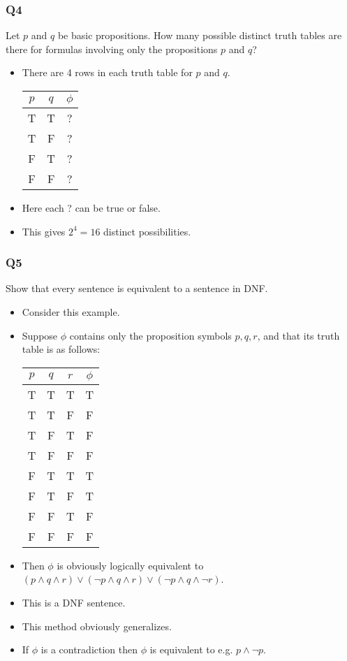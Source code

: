 \documentclass[handout]{beamer}
\begin{document}
\begin{frame}
\frametitle{Q4}
Let $p$ and $q$ be basic propositions. How many possible distinct truth tables are there for formulas involving only the propositions $p$ and $q$?
\vspace{0.5cm}
\begin{itemize}
\item There are 4 rows in each truth table for $p$ and $q$.

{\centering
\begin{tabular}{ c c c }
 $p$ & $q$ & $\phi$ \\ \hline 
 T & T & ?  \\  
 T & F & ?  \\
 F & T & ?  \\
 F & F & ?  
\end{tabular}\par}

\item Here each ? can be true or false. 
\item This gives $2^4 = 16$ distinct possibilities.
\end{itemize}
\end{frame}

\begin{frame}
\frametitle{Q5}
Show that every sentence is equivalent to a sentence in DNF.
\begin{itemize}
\item Consider this example. 
\item Suppose $\phi$ contains only the proposition symbols $p,q,r$, and that its truth table is as follows:

{\centering
\begin{tabular}{ c c c c }
 $p$ & $q$ & $r$ & $\phi$ \\ \hline 
 T & T & T & T  \\  
 T & T & F & F  \\
 T & F & T & F  \\
 T & F & F & F  \\
 F & T & T & T  \\  
 F & T & F & T  \\
 F & F & T & F  \\
 F & F & F & F  \\
\end{tabular}\par}
\item Then $\phi$ is obviously logically equivalent to $(p\wedge q \wedge r) \vee (\neg p\wedge q \wedge r) \vee (\neg p \wedge q \wedge \neg r)$. 
\item This is a DNF sentence. 
\item This method obviously generalizes. 
\item If $\phi$ is a contradiction then $\phi$ is equivalent to e.g. $p\wedge \neg p$.
\end{itemize}
\end{frame}
\end{document}
